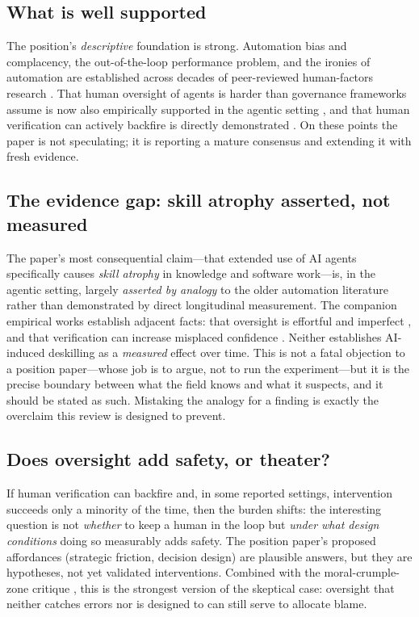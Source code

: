\documentclass[11pt]{article}
\begin{document}
\subsection{What is well supported}

The position's \emph{descriptive} foundation is strong. Automation bias and complacency,
the out-of-the-loop performance problem, and the ironies of automation are established
across decades of peer-reviewed human-factors research
\citep{bainbridge1983,parasuraman1997,parasuraman2000,parasuraman2010}. That human
oversight of agents is harder than governance frameworks assume is now also empirically
supported in the agentic setting \citep{dhanorkar2026}, and that human verification can
actively backfire is directly demonstrated \citep{recchia2025}. On these points the paper
is not speculating; it is reporting a mature consensus and extending it with fresh evidence.

\subsection{The evidence gap: skill atrophy asserted, not measured}

The paper's most consequential claim---that extended use of AI agents specifically causes
\emph{skill atrophy} in knowledge and software work---is, in the agentic setting, largely
\emph{asserted by analogy} to the older automation literature rather than demonstrated by
direct longitudinal measurement. The companion empirical works establish adjacent facts:
that oversight is effortful and imperfect \citep{dhanorkar2026}, and that verification can
increase misplaced confidence \citep{recchia2025}. Neither establishes AI-induced
deskilling as a \emph{measured} effect over time. This is not a fatal objection to a
position paper---whose job is to argue, not to run the experiment---but it is the precise
boundary between what the field knows and what it suspects, and it should be stated as such.
Mistaking the analogy for a finding is exactly the overclaim this review is designed to
prevent.

\subsection{Does oversight add safety, or theater?}

If human verification can backfire \citep{recchia2025} and, in some reported settings,
intervention succeeds only a minority of the time, then the burden shifts: the interesting
question is not \emph{whether} to keep a human in the loop but \emph{under what design
conditions} doing so measurably adds safety. The position paper's proposed affordances
(strategic friction, decision design) are plausible answers, but they are hypotheses, not
yet validated interventions. Combined with the moral-crumple-zone critique
\citep{elish2019}, this is the strongest version of the skeptical case: oversight that
neither catches errors nor is designed to can still serve to allocate blame.
\end{document}
